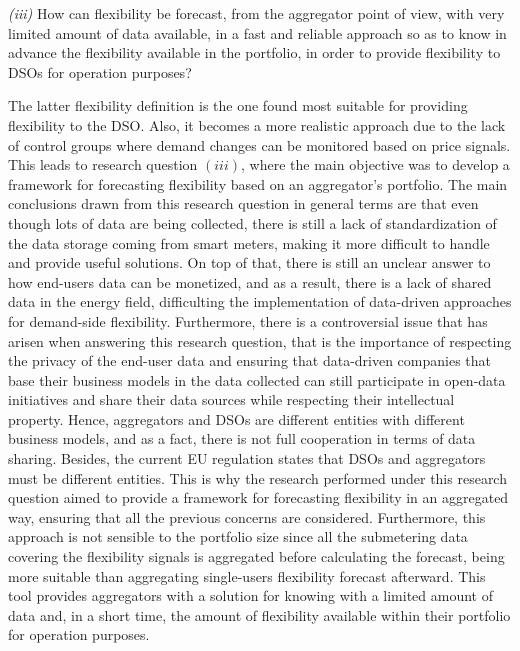 \begin{tcolorbox}
\textit{(iii)} How can flexibility be forecast, from the aggregator point of view, with very limited amount of data available, in a fast and reliable approach so as to know in advance the flexibility available in the portfolio, in order to provide flexibility to DSOs for operation purposes?
\end{tcolorbox}

The latter flexibility definition is the one found most suitable for providing flexibility to the DSO. Also, it becomes a more realistic approach due to the lack of control groups where demand changes can be monitored based on price signals. This leads to research question $(iii)$, where the main objective was to develop a framework for forecasting flexibility based on an aggregator's portfolio. The main conclusions drawn from this research question in general terms are that even though lots of data are being collected, there is still a lack of standardization of the data storage coming from smart meters, making it more difficult to handle and provide useful solutions. On top of that, there is still an unclear answer to how end-users data can be monetized, and as a result, there is a lack of shared data in the energy field, difficulting the implementation of data-driven approaches for demand-side flexibility. Furthermore, there is a controversial issue that has arisen when answering this research question, that is the importance of respecting the privacy of the end-user data and ensuring that data-driven companies that base their business models in the data collected can still participate in open-data initiatives and share their data sources while respecting their intellectual property. Hence, aggregators and DSOs are different entities with different business models, and as a fact, there is not full cooperation in terms of data sharing. Besides, the current EU regulation states that DSOs and aggregators must be different entities. This is why the research performed under this research question aimed to provide a framework for forecasting flexibility in an aggregated way, ensuring that all the previous concerns are considered. Furthermore, this approach is not sensible to the portfolio size since all the submetering data covering the flexibility signals is aggregated before calculating the forecast, being more suitable than aggregating single-users flexibility forecast afterward. This tool provides aggregators with a solution for knowing with a limited amount of data and, in a short time, the amount of flexibility available within their portfolio for operation purposes. 

